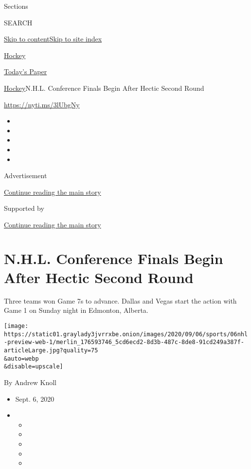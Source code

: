 Sections

SEARCH

\protect\hyperlink{site-content}{Skip to
content}\protect\hyperlink{site-index}{Skip to site index}

\href{https://www.nytimes3xbfgragh.onion/section/sports/hockey}{Hockey}

\href{https://myaccount.nytimes3xbfgragh.onion/auth/login?response_type=cookie\&client_id=vi}{}

\href{https://www.nytimes3xbfgragh.onion/section/todayspaper}{Today's
Paper}

\href{/section/sports/hockey}{Hockey}\textbar{}N.H.L. Conference Finals
Begin After Hectic Second Round

\url{https://nyti.ms/3lUbgNy}

\begin{itemize}
\item
\item
\item
\item
\item
\end{itemize}

Advertisement

\protect\hyperlink{after-top}{Continue reading the main story}

Supported by

\protect\hyperlink{after-sponsor}{Continue reading the main story}

\hypertarget{nhl-conference-finals-begin-after-hectic-second-round}{%
\section{N.H.L. Conference Finals Begin After Hectic Second
Round}\label{nhl-conference-finals-begin-after-hectic-second-round}}

Three teams won Game 7s to advance. Dallas and Vegas start the action
with Game 1 on Sunday night in Edmonton, Alberta.

\texttt{[image: https://static01.graylady3jvrrxbe.onion/images/2020/09/06/sports/06nhl-preview-web-1/merlin\_176593746\_5cd6ecd2-8d3b-487c-8de8-91cd249a387f-articleLarge.jpg?quality=75\\\&auto=webp\\\&disable=upscale]}

By Andrew Knoll

\begin{itemize}
\item
  Sept. 6, 2020
\item
  \begin{itemize}
  \item
  \item
  \item
  \item
  \item
  \end{itemize}
\end{itemize}

